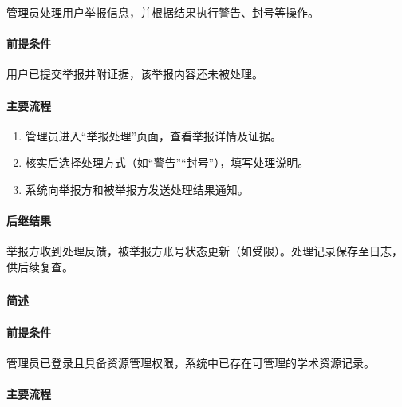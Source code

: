 {管理员处理用户举报信息，并根据结果执行警告、封号等操作。

\paragraph*{前提条件}

用户已提交举报并附证据，该举报内容还未被处理。

\paragraph*{主要流程}

\begin{enumerate}
    \item 管理员进入“举报处理”页面，查看举报详情及证据。
    \item 核实后选择处理方式（如“警告”“封号”），填写处理说明。
    \item 系统向举报方和被举报方发送处理结果通知。
\end{enumerate}

\paragraph*{后继结果}

举报方收到处理反馈，被举报方账号状态更新（如受限）。处理记录保存至日志，供后续复查。

}

\subsubsection{}

\paragraph*{简述}


\paragraph*{前提条件}

管理员已登录且具备资源管理权限，系统中已存在可管理的学术资源记录。

\paragraph*{主要流程}

